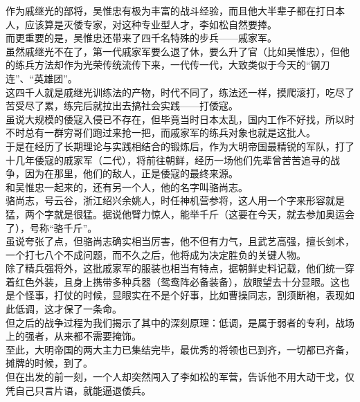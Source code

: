 \begin{multicols}{\theparacolNo}
作为戚继光的部将，吴惟忠有极为丰富的战斗经验，而且他大半辈子都在打日本人，应该算是灭倭专家，对这种专业型人才，李如松自然要捧。\\

而更重要的是，吴惟忠还带来了四千名特殊的步兵——戚家军。\\

虽然戚继光不在了，第一代戚家军要么退了休，要么升了官（比如吴惟忠），但他的练兵方法却作为光荣传统流传下来，一代传一代，大致类似于今天的“钢刀连”、“英雄团”。\\

这四千人就是戚继光训练法的产物，时代不同了，练法还一样，摸爬滚打，吃尽了苦受尽了累，练完后就拉出去搞社会实践——打倭寇。\\

虽说大规模的倭寇入侵已不存在，但毕竟当时日本太乱，国内工作不好找，所以时不时总有一群穷哥们跑过来抢一把，而戚家军的练兵对象也就是这批人。\\

于是在经历了长期理论与实践相结合的锻炼后，作为大明帝国最精锐的军队，打了十几年倭寇的戚家军（二代），将前往朝鲜，经历一场他们先辈曾苦苦追寻的战争，因为在那里，他们的敌人，正是倭寇的最终来源。\\

和吴惟忠一起来的，还有另一个人，他的名字叫骆尚志。\\

骆尚志，号云谷，浙江绍兴余姚人，时任神机营参将，这人用一个字来形容就是猛，两个字就是很猛。据说他臂力惊人，能举千斤（这要在今天，就去参加奥运会了），号称“骆千斤”。\\

虽说夸张了点，但骆尚志确实相当厉害，他不但有力气，且武艺高强，擅长剑术，一个打七八个不成问题，而不久之后，他将成为决定胜负的关键人物。\\

除了精兵强将外，这批戚家军的服装也相当有特点，据朝鲜史料记载，他们统一穿着红色外装，且身上携带多种兵器（鸳鸯阵必备装备），放眼望去十分显眼。这也是个怪事，打仗的时候，显眼实在不是个好事，比如曹操同志，割须断袍，表现如此低调，这才保了一条命。\\

但之后的战争过程为我们揭示了其中的深刻原理：低调，是属于弱者的专利，战场上的强者，从来都不需要掩饰。\\

至此，大明帝国的两大主力已集结完毕，最优秀的将领也已到齐，一切都已齐备，摊牌的时候，到了。\\

但在出发的前一刻，一个人却突然闯入了李如松的军营，告诉他不用大动干戈，仅凭自己只言片语，就能逼退倭兵。\\


\end{multicols}
